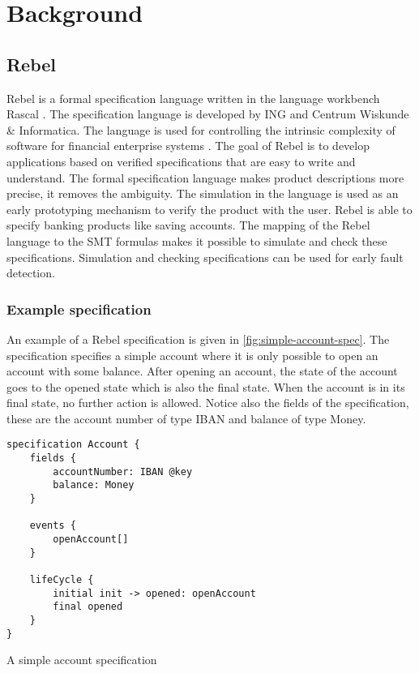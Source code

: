 \chapter{Background}

\section{Rebel}

Rebel is a formal specification language written in the language workbench Rascal \cite{RascalGTTSE}. The specification language is developed by ING and Centrum Wiskunde \& Informatica. The language is used for controlling the intrinsic complexity of software for financial enterprise systems \cite[p.1]{stoel_storm_vinju_bosman_2016}. The goal of Rebel is to develop applications based on verified specifications that are easy to write and understand.
The formal specification language makes product descriptions more precise, it removes the ambiguity. The simulation in the language is used as an early prototyping mechanism to verify the product with the user. 
Rebel is able to specify banking products like saving accounts. The mapping of the Rebel language to the SMT formulas makes it possible to simulate and check these specifications. Simulation and checking specifications can be used for early fault detection.

\subsection{Example specification}
An example of a Rebel specification is given in \autoref{fig:simple-account-spec}. The specification specifies a simple account where it is only possible to open an account with some balance. After opening an account, the state of the account goes to the opened state which is also the final state. When the account is in its final state, no further action is allowed. Notice also the fields of the specification, these are the account number of type IBAN and balance of type Money.

\begin{sourcecode}[h]
\begin{lstlisting}[]
specification Account {
	fields {
		accountNumber: IBAN @key
		balance: Money		
	}
	
	events { 
		openAccount[]
	}
	
	lifeCycle {
		initial init -> opened: openAccount
		final opened		
	}
}
\end{lstlisting}
\caption{A simple account specification}
\label{fig:simple-account-spec}
\end{sourcecode}

